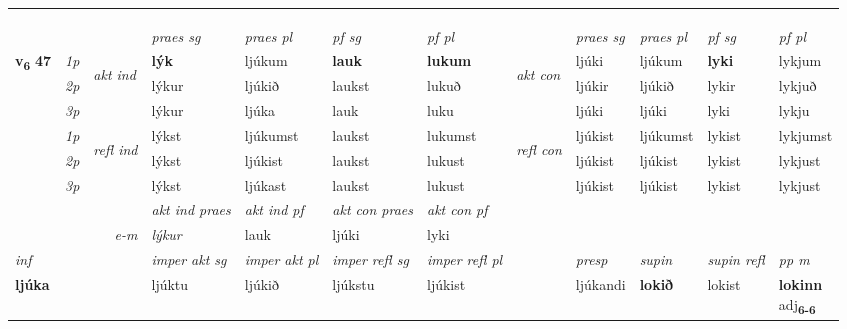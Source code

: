 \begin{longtable}[l]{X>{\footnotesize\itshape}llXXXXlXXXX}
\midrule
& \\*
   & \\*
  & \\
   \midrule
 & &   & \textit{praes sg}  & \textit{praes pl}    & \textit{ pf sg} & \textit{pf pl} & & \textit{praes sg}  & \textit{praes pl}    & \textit{pf sg} & \textit{pf pl }  \\ \cmidrule{4-7} \cmidrule{9-12}
 \multirow{2}{*}{{{\textbf{v{\textsubscript{6}}} \Large{\textbf{47}}}}}  & 1p & \multirow{3}{*}{\begin{turn}{90}\textit{akt ind}\end{turn}} & \textbf{lýk} & ljúkum & \textbf{lauk} & \textbf{lukum} & \multirow{3}{*}{\begin{turn}{90}\textit{akt con}\end{turn}} &ljúki & ljúkum & \textbf{lyki} & lykjum\\*
 & 2p &  &  lýkur  & ljúkið & laukst & lukuð & & ljúkir & ljúkið & lykir & lykjuð \\*
 & 3p &  & lýkur & ljúka & lauk & luku & & ljúki & ljúki& lyki & lykju \\*
\cmidrule{4-7} \cmidrule{9-12}
 & 1p & \multirow{3}{*}{\begin{turn}{90}\textit{refl ind}\end{turn}}  & lýkst & ljúkumst & laukst & lukumst & \multirow{3}{*}{\begin{turn}{90}\textit{refl con}\end{turn}}  &ljúkist & ljúkumst & lykist & lykjumst \\*
 & 2p &  & lýkst & ljúkist & laukst & lukust & &ljúkist & ljúkist & lykist & lykjust \\*
 & 3p  & & lýkst & ljúkast & laukst & lukust & & ljúkist & ljúkist& lykist & lykjust \\*
\cmidrule{4-7} \cmidrule{9-12}

   && &  \textit{akt ind praes} & \textit{akt ind pf} & \textit{akt con praes} & \textit{akt con pf} \\*
\multicolumn{3}{r}{\textit{e-m}} & lýkur & lauk & ljúki & lyki \\*

\cmidrule{4-7}
   {\textit{inf}} & &  & \textit{imper akt sg} & \textit{imper akt pl} & \textit{imper refl sg} & \textit{imper refl pl} && \textit{presp} & \textit{supin} & \textit{supin refl} & \textit{pp m} \\*
  {\textbf{ljúka}} & && ljúktu  & ljúkið & ljúkstu & ljúkist && ljúkandi &  \textbf{lokið} & lokist & \specialcell{\textbf{lokinn} \\ adj\textbf{\textsubscript{6-6}}} \\*


\end{longtable}
